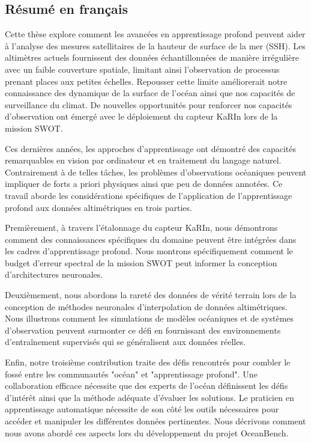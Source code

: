 \begin{bibunit}

\chapter*{Résumé en français}
Cette thèse explore comment les avancées en apprentissage profond peuvent aider à l'analyse des mesures satellitaires de la hauteur de surface de la mer (SSH). Les altimètres actuels fournissent des données échantillonnées de manière irrégulière avec un faible couverture spatiale, limitant ainsi l'observation de processus prenant places aux petites échelles. Repousser cette limite améliorerait notre connaissance des dynamique de la surface de l'océan ainsi que nos capacités de surveillance du climat. De nouvelles opportunités pour renforcer nos capacités d'observation ont émergé avec le déploiement du capteur KaRIn lors de la mission SWOT.

Ces dernières années, les approches d'apprentissage ont démontré des capacités remarquables en vision par ordinateur et en traitement du langage naturel. Contrairement à de telles tâches, les problèmes d'observations océaniques peuvent impliquer de forts a priori physiques ainsi que peu de données annotées. Ce travail aborde les considérations spécifiques de l'application de l'apprentissage profond aux données altimétriques en trois parties.

Premièrement, à travers l'étalonnage du capteur KaRIn, nous démontrons comment des connaissances spécifiques du domaine peuvent être intégrées dans les cadres d'apprentissage profond. Nous montrons spécifiquement comment le budget d'erreur spectral de la mission SWOT peut informer la conception d'architectures neuronales.

Deuxièmement, nous abordons la rareté des données de vérité terrain lors de la conception de méthodes neuronales d'interpolation de données altimétriques. Nous illustrons comment les simulations de modèles océaniques et de systèmes d'observation peuvent surmonter ce défi en fournissant des environnements d'entraînement supervisés qui se généralisent aux données réelles.

Enfin, notre troisième contribution traite des défis rencontrés pour combler le fossé entre les communautés "océan" et "apprentissage profond". Une collaboration efficace nécessite que des experts de l'océan définissent les défis d'intérêt ainsi que la méthode adéquate d'évaluer les solutions. Le praticien en apprentissage automatique nécessite de son côté les outils nécessaires pour accéder et manipuler les différentes données pertinentes.  Nous décrivons comment nous avons abordé ces aspects lors du développement du projet OceanBench.


\end{bibunit}
